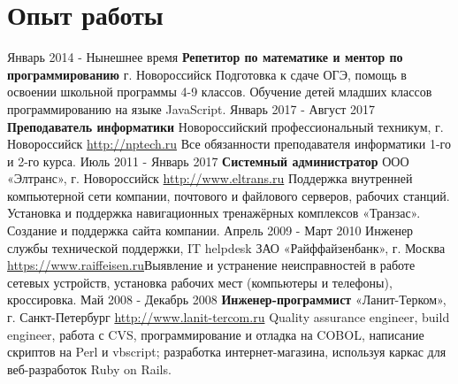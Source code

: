 \documentclass[11pt,a4paper]{moderncv}
\begin{document}
\maketitle
\section{Опыт работы}
\cventry
  {Январь 2014 - Нынешнее время}
  {\textbf{Репетитор по математике и ментор по программированию}}
  {г. Новороссийск}
  {}{}{Подготовка к сдаче ОГЭ, помощь  в освоении школьной программы 4-9 классов.\newline 
  Обучение детей младших классов программированию на языке JavaScript.\newline{}}
  \cventry
    {Январь 2017 - Август 2017}
    {\textbf{Преподаватель информатики}}
    {Новороссийский профессиональный техникум,\newline{} г. Новороссийск}
    {\url{http://nptech.ru}}{}
    {Все обязанности преподавателя информатики 1-го и 2-го курса.\newline{}}
  \cventry
  {Июль 2011 - Январь 2017}
  {\textbf{Системный администратор}}
  {ООО «Элтранс», г. Новороссийск}
  {\newline{}\url{http://www.eltrans.ru}}{}
  {Поддержка внутренней компьютерной сети компании, почтового и файлового \newline{}серверов, рабочих станций. Установка и поддержка навигационных тренажёрных \newline{}комплексов «Транзас». Создание и поддержка сайта компании.\newline{}}
\cventry
  {Апрель 2009 - Март 2010}
  {Инженер службы технической поддержки, IT helpdesk}
  {ЗАО «Райффайзенбанк», г. Москва}
  {\url{https://www.raiffeisen.ru}}{}{Выявление и устранение неисправностей в работе сетевых устройств, установка рабочих мест (компьютеры и телефоны), кроссировка.\newline{}}
\cventry
  {Май 2008 - Декабрь 2008}
  {\textbf{Инженер-программист}}
  {«Ланит-Терком», г. Санкт-Петербург}
  {\newline{}\url{http://www.lanit-tercom.ru}}{}
  {Quality assurance engineer, build engineer, работа с CVS, программирование и отладка на COBOL, 
  написание скриптов на Perl и vbscript;\newline{}
   разработка интернет-магазина, используя каркас для веб-разработок Ruby on Rails.}
\end{document}
